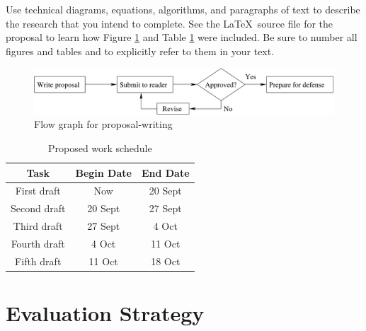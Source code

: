 \documentclass[11pt]{article}
\begin{document}

Use technical diagrams, equations, algorithms, and paragraphs of text
to describe the research that you intend to complete. See the \LaTeX\ source
file for the proposal to learn how Figure \ref{intro-fig1} and Table
\ref{intro-tab1} were included. Be sure to number all figures and tables and to
explicitly refer to them in your text.

\begin{figure}[htbp]
  \centering
  \includegraphics[width=5in]{flow.pdf}
  \caption{Flow graph for proposal-writing}
  \label{intro-fig1}
\end{figure}

\begin{table}[htbp]
  \centering
  \begin{tabular}{|c||c|c|}
    \hline

    \bf Task     & \bf Begin Date & \bf End Date \\ \hline\hline
    First draft  & Now            & 20 Sept      \\ \hline
    Second draft & 20 Sept        & 27 Sept      \\ \hline
    Third draft  & 27 Sept        & 4 Oct        \\ \hline
    Fourth draft & 4 Oct          & 11 Oct       \\ \hline
    Fifth draft  & 11 Oct         & 18 Oct       \\ \hline

  \end{tabular}
  \caption{Proposed work schedule}
  \label{intro-tab1}
\end{table}

\section{Evaluation Strategy}
\label{sec:evaluate}

\end{document}
